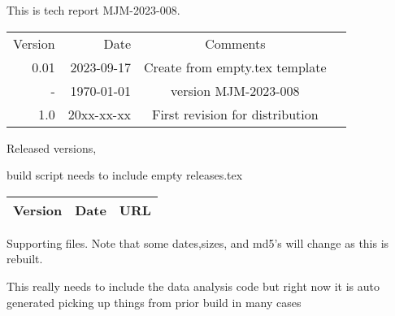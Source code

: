 \documentclass[aps,secnumarabic,balancelastpage,amsmath,amssymb,nofootinbib]{revtex4}
\newcommand{\mjmversion}{\mjmrelease} %
\newcommand{\mjmtrno}{MJM-2023-008}
\newcommand{\mjmversion}{0.00} %
\newcommand{\mjmtrno}{MJM-2023-008}
\newcommand{\mjmmakedate}{2023-09-17 }
\newcommand{\mjmbasename}{\jobname}
\begin{document}
This is tech report \mjmtrno. 

\begin{table}[H] \centering
\begin{tabular}{r|r|c|r}
Version & Date & Comments  &  \\
0.01 & \mjmmakedate  &  Create from empty.tex template  &  \\
-  & \today & version  \mjmversion { }   \mjmtrno  &  \\
1.0 & 20xx-xx-xx & First revision for distribution &  \\
\end{tabular}
\end{table}


Released versions,

build script needs to include empty releases.tex
\begin{table}[H] \centering
\begin{tabular}{|r|r|l|}
Version & Date & URL    \\
\hline

\hline
\end{tabular}
\end{table}





%

\begin{minipage}{\linewidth}
%
%
\mjmshowbib
\end{minipage}





\vspace{1cm}
Supporting files. Note that some dates,sizes, and md5's will change as this is
rebuilt.

This really needs to include the data analysis code 
but right now it is auto generated picking up things from prior
build in many cases 

\end{document}
